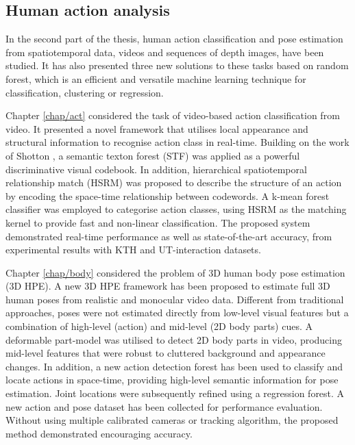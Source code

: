 \subsection{Human action analysis}

In the second part of the thesis, human action classification and pose estimation from spatiotemporal data, \eg videos and sequences of depth images, have been studied. 
It has also presented three new solutions to these tasks based on random forest, which is an efficient and versatile machine learning technique for classification, clustering or regression. 

Chapter \ref{chap/act} considered the task of video-based action classification from video. It presented a novel framework that utilises local appearance and structural information to recognise action class in real-time. Building on the work of Shotton \etal \cite{Shotton2008}, a semantic texton forest (STF) was applied as a powerful discriminative visual codebook. In addition, hierarchical spatiotemporal relationship match (HSRM) was proposed to describe the structure of an action by encoding the space-time relationship between codewords. A k-mean forest classifier was employed to categorise action classes, using HSRM as the matching kernel to provide fast and non-linear classification. 
The proposed system demonstrated real-time performance as well as state-of-the-art accuracy, from experimental results with KTH and UT-interaction datasets. 

Chapter \ref{chap/body} considered the problem of 3D human body pose estimation (3D HPE).
A new 3D HPE framework has been proposed to estimate full 3D human poses from realistic and monocular video data. Different from traditional approaches, poses were not estimated directly from low-level visual features but a combination of high-level (action) and mid-level (2D body parts) cues. 
A deformable part-model was utilised to detect 2D body parts in video, producing mid-level features that were robust to cluttered background and appearance changes. In addition, a new action detection forest has been used to classify and locate actions in space-time, providing high-level semantic information for pose estimation. Joint locations were subsequently refined using a regression forest. A new action and pose dataset has been collected for performance evaluation. Without using multiple calibrated cameras or tracking algorithm, the proposed method demonstrated encouraging accuracy.

